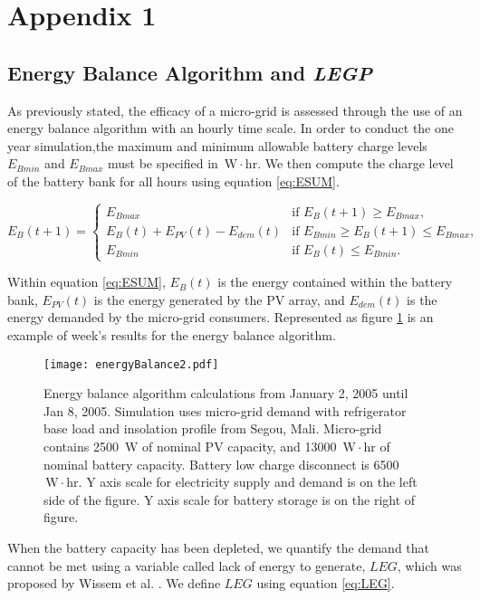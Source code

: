 \documentclass[11p]{article}
\newcommand{\unit}[1]{\ensuremath{\, \mathrm{#1}}}
\begin{document}
\appendix	
\section{Appendix 1} \label{A1}

\subsection{Energy Balance Algorithm and \emph{LEGP}}

As previously stated, the efficacy of a micro-grid is assessed through the use of an energy balance algorithm with an hourly time scale. 
In order to conduct the one year simulation,the maximum and minimum allowable battery charge levels $E_{Bmin}$ and $E_{Bmax}$ must be specified in \unit{W\! \cdot \! hr}.
We then compute the charge level of the battery bank for all hours using equation \ref{eq:ESUM}. 

\begin{equation} \label{eq:ESUM}
E_B(t+1) =
\begin{cases}
E_{Bmax} & \text{if } E_B(t+1) \geq E_{Bmax},\\
E_B (t) + E_{PV} (t) - E_{dem} (t) & \text{if } E_{Bmin}\geq E_B(t+1)\leq E_{Bmax},\\
E_{Bmin} & \text{if } E_B(t) \leq E_{Bmin}.
\end{cases}
\end{equation}

Within equation \ref{eq:ESUM}, $E_B(t)$ is the energy contained within the battery bank, $E_{PV}(t)$ is the energy generated by the PV array, and $E_{dem}(t)$ is the energy demanded by the micro-grid consumers.
Represented as figure \ref{energyBalance} is an example of week's results for the energy balance algorithm. 
\begin{figure}[ht] 
  \centering
    \texttt{[image: energyBalance2.pdf]}
  \caption{Energy balance algorithm calculations from January 2, 2005 until Jan 8, 2005.
Simulation uses micro-grid demand with refrigerator base load and insolation profile from Segou, Mali. 
Micro-grid contains 2500 \unit{W} of nominal PV capacity, and 13000 \unit{W\! \cdot \! hr} of nominal battery capacity. 
Battery low charge disconnect is 6500 \unit{W\! \cdot \! hr}. 
Y axis scale for electricity supply and demand is on the left side of the figure.
Y axis scale for battery storage is on the right of figure.}
\label{energyBalance}
\end{figure}
When the battery capacity has been depleted, we quantify the demand that cannot be met using a variable called lack of energy to generate, $LEG$, which was proposed by Wissem et al. \cite{Wissem}. 
We define $LEG$ using equation \ref{eq:LEG}. 
\end{document}
